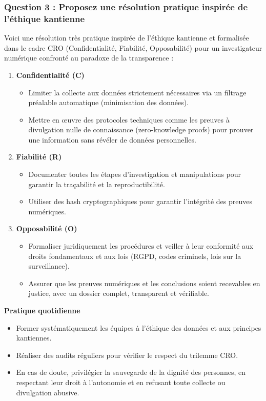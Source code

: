 \documentclass[12pt, a4paper]{article}
\begin{document}
	\subsubsection*{Question 3 : Proposez une résolution pratique inspirée de l'éthique kantienne}
	
	Voici une résolution très pratique inspirée de l'éthique kantienne et formalisée dans le cadre CRO (Confidentialité, Fiabilité, Opposabilité) pour un investigateur numérique confronté au paradoxe de la transparence :
	
	\begin{enumerate}
		\item \textbf{Confidentialité (C)}
		\begin{itemize}
			\item Limiter la collecte aux données strictement nécessaires via un filtrage préalable automatique (minimisation des données).
			\item Mettre en œuvre des protocoles techniques comme les preuves à divulgation nulle de connaissance (zero-knowledge proofs) pour prouver une information sans révéler de données personnelles.
		\end{itemize}
		
		\item \textbf{Fiabilité (R)}
		\begin{itemize}
			\item Documenter toutes les étapes d'investigation et manipulations pour garantir la traçabilité et la reproductibilité.
			\item Utiliser des hash cryptographiques pour garantir l'intégrité des preuves numériques.
		\end{itemize}
		
		\item \textbf{Opposabilité (O)}
		\begin{itemize}
			\item Formaliser juridiquement les procédures et veiller à leur conformité aux droits fondamentaux et aux lois (RGPD, codes criminels, lois sur la surveillance).
			\item Assurer que les preuves numériques et les conclusions soient recevables en justice, avec un dossier complet, transparent et vérifiable.
		\end{itemize}
	\end{enumerate}
	
	\textbf{Pratique quotidienne}
	\begin{itemize}
		\item Former systématiquement les équipes à l'éthique des données et aux principes kantiennes.
		\item Réaliser des audits réguliers pour vérifier le respect du trilemme CRO.
		\item En cas de doute, privilégier la sauvegarde de la dignité des personnes, en respectant leur droit à l'autonomie et en refusant toute collecte ou divulgation abusive.
	\end{itemize}
	
\end{document}
